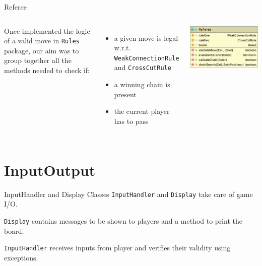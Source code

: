\documentclass{beamer}
\begin{document}
\begin{frame}{Referee}
	\begin{columns}
	Once implemented the logic of a valid move in \texttt{Rules} package, our aim was to group together all the methods needed to check if:
	\vspace{0.4cm}
	\begin{itemize}
		\item a given move is legal w.r.t. \texttt{WeakConnectionRule} and \texttt{CrossCutRule}
		\vspace{0.25cm}
		\item a winning chain is present
		\vspace{0.25cm}
		\item the current player has to pass
	\end{itemize}
	
	
		\includegraphics[scale=0.27]{images/referee-class.jpg}
	
	\end{columns}
\end{frame}



\section{InputOutput}

\begin{frame}{InputHandler and Display}
	Classes \texttt{InputHandler} and \texttt{Display} take care of game I/O.

	 \texttt{Display} contains messages to be shown to players and a method to print the board.
	
	 \texttt{InputHandler} receives inputs from player and verifies their validity using exceptions.  
\end{frame}
\end{document}
